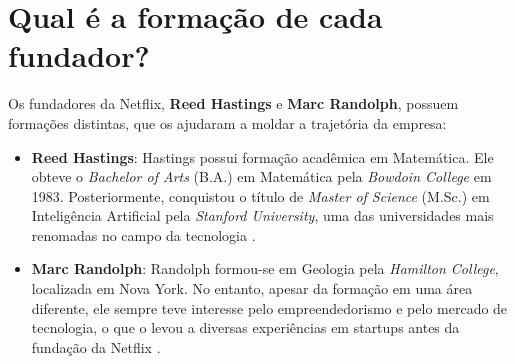 \section{Qual é a formação de cada fundador?}

Os fundadores da Netflix, \textbf{Reed Hastings} e \textbf{Marc Randolph}, possuem formações distintas, que os ajudaram a moldar a trajetória da empresa:

\begin{itemize}
    \item \textbf{Reed Hastings}: Hastings possui formação acadêmica em Matemática. Ele obteve o \textit{Bachelor of Arts} (B.A.) em Matemática pela \textit{Bowdoin College} em 1983. Posteriormente, conquistou o título de \textit{Master of Science} (M.Sc.) em Inteligência Artificial pela \textit{Stanford University}, uma das universidades mais renomadas no campo da tecnologia \cite{reed_hastings_wikipedia}.
    
    \item \textbf{Marc Randolph}: Randolph formou-se em Geologia pela \textit{Hamilton College}, localizada em Nova York. No entanto, apesar da formação em uma área diferente, ele sempre teve interesse pelo empreendedorismo e pelo mercado de tecnologia, o que o levou a diversas experiências em startups antes da fundação da Netflix \cite{marc_randolph_wikipedia}.
\end{itemize}
